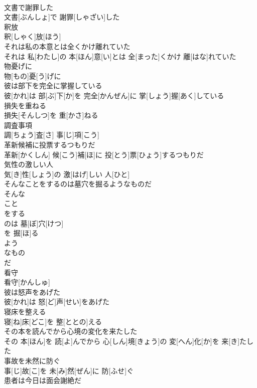 \documentclass[8pt]{extreport}
\begin{document}
\begin{CJK}{UTF8}{min}
\\	文書で謝罪した	
\\	文書[ぶんしょ]で 謝罪[しゃざい]した
\\	釈放	
\\	釈[しゃく]放[ほう]
\\	それは私の本意とは全くかけ離れていた	
\\	それは 私[わたし]の 本[ほん]意[い]とは 全[まった]くかけ 離[はな]れていた
\\	物憂げに	
\\	物[もの]憂[う]げに
\\	彼は部下を完全に掌握している	
\\	彼[かれ]は 部[ぶ]下[か]を 完全[かんぜん]に 掌[しょう]握[あく]している
\\	損失を重ねる	
\\	損失[そんしつ]を 重[かさ]ねる
\\	調査事項	
\\	調[ちょう]査[さ] 事[じ]項[こう]
\\	革新候補に投票するつもりだ	
\\	革新[かくしん] 候[こう]補[ほ]に 投[とう]票[ひょう]するつもりだ
\\	気性の激しい人	
\\	気[き]性[しょう]の 激[はげ]しい 人[ひと]
\\	そんなことをするのは墓穴を掘るようなものだ	
\\	そんな 
\\	こと 
\\	をする 
\\	のは 墓[ぼ]穴[けつ]
\\	を 掘[ほ]る 
\\	よう 
\\	なもの 
\\	だ
\\	看守	
\\	看守[かんしゅ]
\\	彼は怒声をあげた	
\\	彼[かれ]は 怒[ど]声[せい]をあげた
\\	寝床を整える	
\\	寝[ね]床[どこ]を 整[ととの]える
\\	その本を読んでから心境の変化を来たした	
\\	その 本[ほん]を 読[よ]んでから 心[しん]境[きょう]の 変[へん]化[か]を 来[き]たした
\\	事故を未然に防ぐ	
\\	事[じ]故[こ]を 未[み]然[ぜん]に 防[ふせ]ぐ
\\	患者は今日は面会謝絶だ	

\end{CJK}
\end{document}
